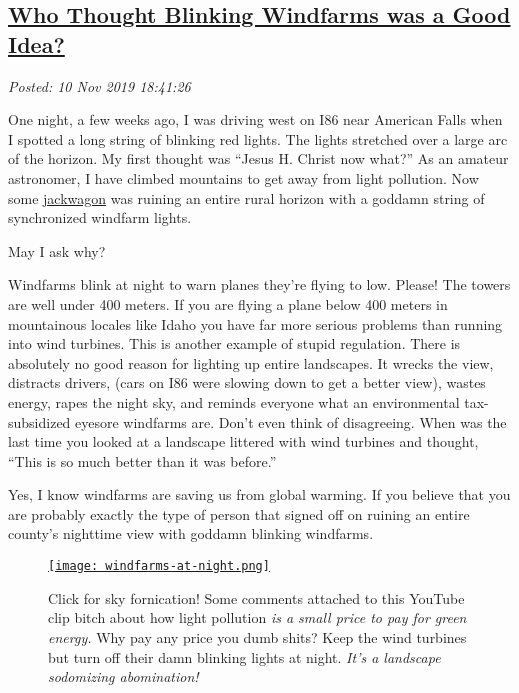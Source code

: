 %


\subsection*{\href{https://analyzethedatanotthedrivel.org/2019/11/10/who-thought-blinking-windfarms-was-a-good-idea/}{Who Thought Blinking Windfarms was a Good Idea?}}


\noindent\emph{Posted: 10 Nov 2019 18:41:26}
\vspace{6pt}

One night, a few weeks ago, I was driving west on I86 near American
Falls when I spotted a long string of blinking red lights. The
lights stretched over a large arc of the horizon. My first thought was
``Jesus H. Christ now what?'' As an amateur astronomer, I have climbed
mountains to get away from light pollution. Now some 
\href{https://www.urbandictionary.com/define.php?term=Jack%20wagon}{jackwagon} was
ruining an entire rural horizon with a goddamn string of synchronized
windfarm lights.

May I ask why?

Windfarms blink at night to warn planes they're flying to low. Please!
The towers are well under 400 meters. If you are flying a plane below
400 meters in mountainous locales like Idaho you have far more serious
problems than running into wind turbines. This is another example of
stupid regulation. There is absolutely no good reason for lighting up
entire landscapes. It wrecks the view, distracts drivers, (cars on I86
were slowing down to get a better view), wastes energy, rapes the night
sky, and reminds everyone what an environmental tax-subsidized eyesore
windfarms are. Don't even think of disagreeing. When was the last time
you looked at a landscape littered with wind turbines and thought,
``This is so much better than it was before.''

Yes, I know windfarms are saving us from global warming. If you believe
that you are probably exactly the type of person that signed off on
ruining an entire county's nighttime view with goddamn blinking
windfarms.


\captionsetup[figure]{labelformat=empty}
\begin{SCfigure}[30][!h]
\centering
\href{https://www.youtube.com/watch?v=JDztGwEqiwQ}{\texttt{[image: windfarms-at-night.png]}}
\caption[Click for sky fornication! Light pollution is
a small price to pay for green energy]{Click for sky fornication! Some comments attached to this YouTube clip bitch about how light pollution \emph{is
a small price to pay for green energy.} Why pay any price you dumb shits? Keep the wind turbines
but turn off their damn blinking lights at night. \emph{It's a landscape sodomizing abomination!}}
\label{fig:5643x0}
\end{SCfigure}

